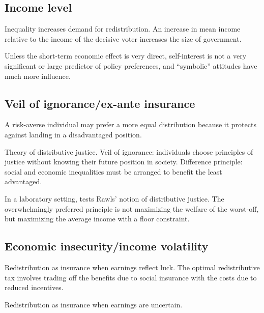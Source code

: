 \documentclass{article}
\newcommand{\citem}[1]{\medskip \noindent \textbf{\cite*{#1}}}
\begin{document}
\subsection{Income level}

\citem{meltzer1981rational}

Inequality increases demand for redistribution. An increase in mean income relative to the income of the decisive voter increases the size of government.

\citem{sears1990limited} 

Unless the short-term economic effect is very direct, self-interest is not a very significant or large predictor of policy preferences, and “symbolic” attitudes have much more influence.

\subsection{Veil of ignorance/ex-ante insurance}

\citem{harsanyi1953cardinal}

A risk-averse individual may prefer a more equal distribution because it protects against landing in a disadvantaged position.

\citem{rawls1971theory}

Theory of distributive justice. Veil of ignorance: individuals choose principles of justice without knowing their future position in society. Difference principle: social and economic inequalities must be arranged to benefit the least advantaged.

\citem{frohlich1987laboratory}

In a laboratory setting, tests Rawls' notion of distributive justice. The overwhelmingly preferred principle is not maximizing the welfare of the worst-off, but maximizing the average income with a floor constraint.

\subsection{Economic insecurity/income volatility}

\citem{varian1980redistributive}

Redistribution as insurance when earnings reflect luck. The optimal redistributive tax involves trading off the benefits due to social insurance with the costs due to reduced incentives.

\citem{eaton1980optimal}

Redistribution as insurance when earnings are uncertain.
\end{document}
